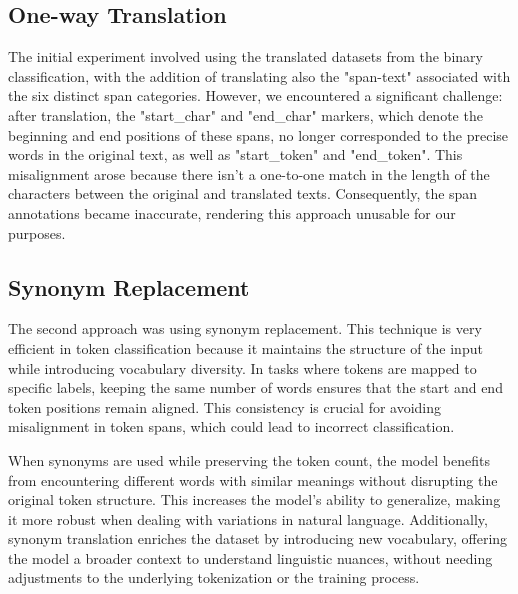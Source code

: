 \documentclass{Configuration_Files/PoliMi3i_thesis}
\begin{document}
\subsection{One-way Translation} \label{subsec:translation_T2}
The initial experiment involved using the translated datasets from the binary classification, with the addition of translating also the "span-text" associated with the six distinct span categories. However, we encountered a significant challenge: after translation, the "start\_char" and "end\_char" markers, which denote the beginning and end positions of these spans, no longer corresponded to the precise words in the original text, as well as "start\_token" and "end\_token". This misalignment arose because there isn't a one-to-one match in the length of the characters between the original and translated texts. Consequently, the span annotations became inaccurate, rendering this approach unusable for our purposes.

\subsection{Synonym Replacement} \label{subsec:synonym_T2}
The second approach was using synonym replacement. This technique is very efficient in token classification because it maintains the structure of the input while introducing vocabulary diversity. In tasks where tokens are mapped to specific labels, keeping the same number of words ensures that the start and end token positions remain aligned. This consistency is crucial for avoiding misalignment in token spans, which could lead to incorrect classification.

When synonyms are used while preserving the token count, the model benefits from encountering different words with similar meanings without disrupting the original token structure. This increases the model’s ability to generalize, making it more robust when dealing with variations in natural language. Additionally, synonym translation enriches the dataset by introducing new vocabulary, offering the model a broader context to understand linguistic nuances, without needing adjustments to the underlying tokenization or the training process.
\end{document}
